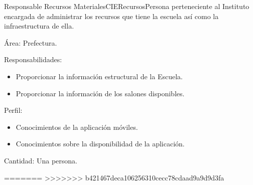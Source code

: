 \begin{actor}{Responsable Recursos Materiales}{CIERecursos}{Persona perteneciente al Instituto encargada de administrar los recursos que tiene la escuela así como la infraestructura de ella.}
	
	\item[Área:] Prefectura.
	\item[Responsabilidades:] \hspace{1pt}
	
	\begin{itemize}
		
		\item Proporcionar la información estructural de la Escuela.
		\item Proporcionar la información de los salones disponibles.
		
	\end{itemize}
	
	\item[Perfil:] \hspace{1pt}
	
	\begin{itemize}
		
		\item Conocimientos de la aplicación móviles.
		\item Conocimientos sobre la disponibilidad de la aplicación.	
	\end{itemize}
	
	\item[Cantidad:] Una persona.
	
\end{actor}
=======
>>>>>>> b421467deca106256310cecc78cdaad9a9d9d3fa
%
%
%
%
%
%

